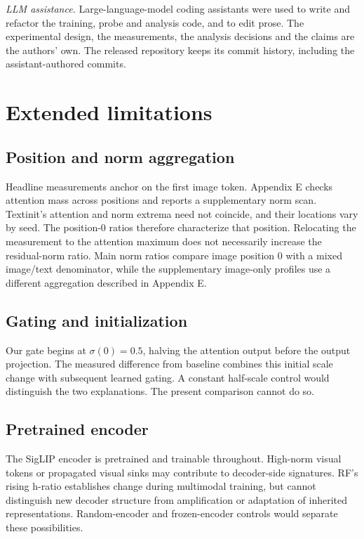 \documentclass{article}
\begin{document}
\textit{LLM assistance.} Large-language-model coding assistants were used to write and refactor the training, probe and analysis code, and to edit prose. The experimental design, the measurements, the analysis decisions and the claims are the authors' own. The released repository keeps its commit history, including the assistant-authored commits.

\FloatBarrier
\section{Extended limitations}

\subsection{Position and norm aggregation}

Headline measurements anchor on the first image token. Appendix E checks attention mass across positions and reports a supplementary norm scan. Textinit's attention and norm extrema need not coincide, and their locations vary by seed. The position-0 ratios therefore characterize that position. Relocating the measurement to the attention maximum does not necessarily increase the residual-norm ratio. Main norm ratios compare image position 0 with a mixed image/text denominator, while the supplementary image-only profiles use a different aggregation described in Appendix E.

\subsection{Gating and initialization}

Our gate begins at $\sigma(0)=0.5$, halving the attention output before the output projection. The measured difference from baseline combines this initial scale change with subsequent learned gating. A constant half-scale control would distinguish the two explanations. The present comparison cannot do so.

\subsection{Pretrained encoder}

The SigLIP encoder is pretrained and trainable throughout. High-norm visual tokens \cite{ref25} or propagated visual sinks \cite{ref11} may contribute to decoder-side signatures. RF's rising h-ratio establishes change during multimodal training, but cannot distinguish new decoder structure from amplification or adaptation of inherited representations. Random-encoder and frozen-encoder controls would separate these possibilities.
\end{document}

